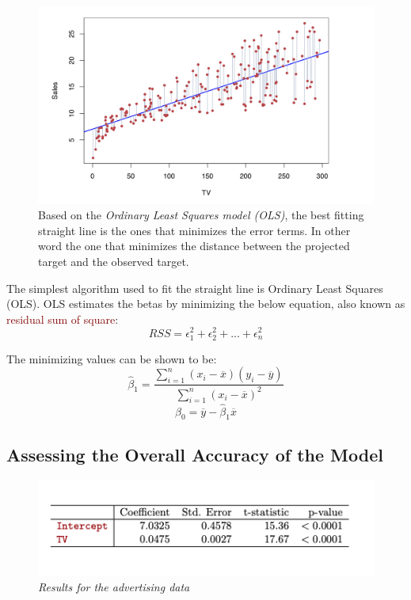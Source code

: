 \documentclass{tufte-handout}
\newcommand{\hlred}[1]{\textcolor{Maroon}{#1}}%
\begin{document}
\begin{figure}
  \includegraphics{Reg_2.png}
  \caption{Based on the 
  \emph{Ordinary Least Squares model (OLS)}, the best fitting straight line is the ones that minimizes the error terms. In other word the one that minimizes the distance between the projected target and the observed target.}
  \label{fig:textfig}
\end{figure}

The simplest algorithm used to fit the straight line is Ordinary Least Squares (OLS). OLS estimates the betas by minimizing the below equation, also known as \hlred{residual sum of square}:
\begin{equation}
    RSS = \epsilon_1^2+\epsilon_2^2+...+\epsilon_n^2
\end{equation}

The minimizing values can be shown to be:
\begin{equation}
    \hat{\beta}_1 = \frac{\sum_{i=1}^{n}(x_i -\overline{x})(y_i -\overline{y})}{\sum_{i=1}^{n}(x_i -\overline{x})^2}
\end{equation}
\begin{equation}
    \hat{\beta}_0 = \overline{y}-\hat{\beta}_1\overline{x}
\end{equation}

\subsection{Assessing the Overall Accuracy of the Model}

\begin{figure}
  \includegraphics{reg_3.png}
  \caption{
  \emph{Results for the advertising data}}
  \label{fig:textfig}
\end{figure}
\end{document}
